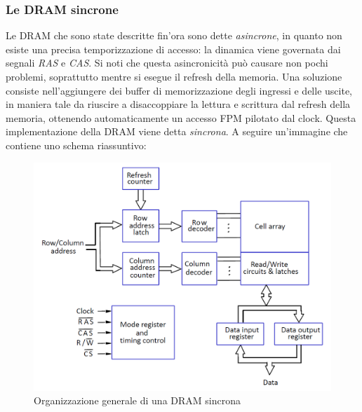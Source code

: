 \documentclass[class=book, crop=false, oneside]{standalone}
\begin{document}
\subsubsection{Le DRAM sincrone}
Le DRAM che sono state descritte fin'ora sono dette \emph{asincrone}, in quanto non esiste una precisa temporizzazione di accesso: la dinamica viene governata dai segnali \emph{RAS} e \emph{CAS}. Si noti che questa asincronicità può causare non pochi problemi, soprattutto mentre si esegue il refresh della memoria. Una soluzione consiste nell'aggiungere dei buffer di memorizzazione degli ingressi e delle uscite, in maniera tale da riuscire a disaccoppiare la lettura e scrittura dal refresh della memoria, ottenendo automaticamente un accesso FPM pilotato dal clock. Questa implementazione della DRAM viene detta \emph{sincrona}. A seguire un'immagine che contiene uno schema riassuntivo:
\begin{figure}[H]
	\centering
	\includegraphics[width=\textwidth,keepaspectratio]{DRAM_sincrona.png}
	\caption{Organizzazione generale di una DRAM sincrona}
\end{figure}
\end{document}
